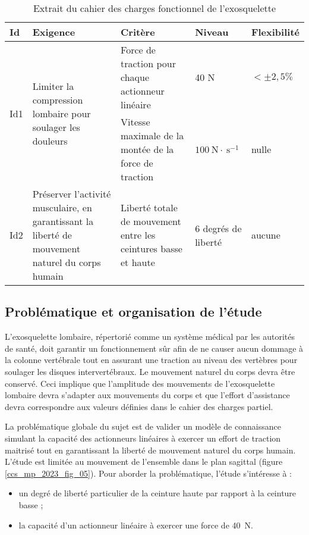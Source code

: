 \begin{table}[h]
\begin{center}
\begin{tabular}{lp{5cm}p{5cm}p{3cm}p{2.5cm}}
\hline
\textbf{Id} & \textbf{Exigence} & \textbf{Critère} & \textbf{Niveau} & \textbf{Flexibilité} \\
\hline
\multirow[t]{2}{*}{Id1} & \multirow[t]{2}{4cm}{Limiter la compression lombaire pour soulager les douleurs} & Force de traction pour chaque actionneur linéaire & 40 N & $< \pm 2,5 \%$ \\
 &  & Vitesse maximale de la montée de la force de traction & $100 \mathrm{~N} \cdot \mathrm{~s}^{-1}$ & nulle \\
\hline
Id2 & Préserver l'activité musculaire, en garantissant la liberté de mouvement naturel du corps humain & Liberté totale de mouvement entre les ceintures basse et haute & 6 degrés de liberté & aucune \\
\hline
\end{tabular}
\caption{Extrait du cahier des charges fonctionnel de l'exosquelette \label{ccs_mp_2023_tab_01}}
\end{center}
\end{table}

\subsection{Problématique et organisation de l'étude}
L'exosquelette lombaire, répertorié comme un système médical par les autorités de santé, doit garantir un fonctionnement sûr afin de ne causer aucun dommage à la colonne vertébrale tout en assurant une traction au niveau des vertèbres pour soulager les disques intervertébraux. Le mouvement naturel du corps devra être conservé. Ceci implique que l'amplitude des mouvements de l'exosquelette lombaire devra s'adapter aux mouvements du corps et que l'effort d'assistance devra correspondre aux valeurs définies dans le cahier des charges partiel.

La problématique globale du sujet est de valider un modèle de connaissance simulant la capacité des actionneurs linéaires à exercer un effort de traction maitrisé tout en garantissant la liberté de mouvement naturel du corps humain.\\
L'étude est limitée au mouvement de l'ensemble dans le plan sagittal (figure \ref{ccs_mp_2023_fig_05}). Pour aborder la problématique, l'étude s'intéresse à :

\begin{itemize}
  \item un degré de liberté particulier de la ceinture haute par rapport à la ceinture basse ;
  \item la capacité d'un actionneur linéaire à exercer une force de \SI{40}{N}.
\end{itemize}

